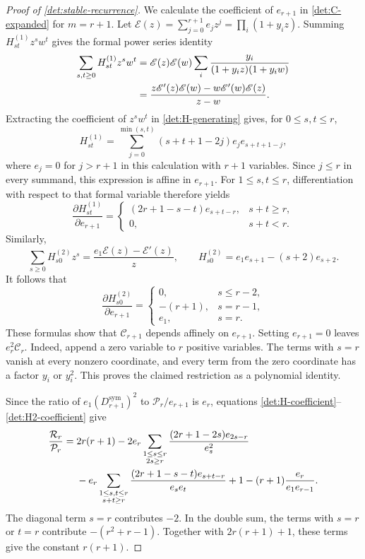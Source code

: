 \begin{proof}[Proof of \cref{det:stable-recurrence}]
We calculate the coefficient of $e_{r+1}$ in
\eqref{det:C-expanded} for $m=r+1$.  Let
$\mathscr E(z)=\sum_{j=0}^{r+1}e_jz^j=\prod_i(1+y_i z)$.
Summing \(H_{st}^{(1)}z^sw^t\) gives the formal power series identity
\begin{align}
 \sum_{s,t\geq0}H_{st}^{(1)}z^sw^t
 &=\mathscr E(z)\mathscr E(w)
       \sum_i\frac{y_i}{(1+y_i z)(1+y_i w)}\notag\\
 &=\frac{z\mathscr E'(z)\mathscr E(w)
          -w\mathscr E'(w)\mathscr E(z)}{z-w}.
 \label{det:H-generating}
\end{align}
Extracting the coefficient of $z^sw^t$ in
\eqref{det:H-generating} gives, for $0\leq s,t\leq r$,
\[
 H_{st}^{(1)}=\sum_{j=0}^{\min(s,t)}
       (s+t+1-2j)e_j e_{s+t+1-j},
\]
where $e_j=0$ for $j>r+1$ in this calculation with $r+1$ variables.
Since $j\leq r$ in every summand, this expression is affine in
$e_{r+1}$. For $1\leq s,t\leq r$, differentiation with respect to
that formal variable therefore yields
\begin{equation}\label{det:H-coefficient}
 \frac{\partial H_{st}^{(1)}}{\partial e_{r+1}}
 =\begin{cases}
   (2r+1-s-t)e_{s+t-r},&s+t\geq r,\\
   0,&s+t<r.
  \end{cases}
\end{equation}
Similarly,
\[
 \sum_{s\geq0}H_{s0}^{(2)}z^s
 =\frac{e_1\mathscr E(z)-\mathscr E'(z)}z,
 \qquad
 H_{s0}^{(2)}=e_1e_{s+1}-(s+2)e_{s+2}.
\]
It follows that
\begin{equation}\label{det:H2-coefficient}
 \frac{\partial H_{s0}^{(2)}}{\partial e_{r+1}}
 =\begin{cases}
   0,&s\leq r-2,\\
   -(r+1),&s=r-1,\\
   e_1,&s=r.
  \end{cases}
\end{equation}
These formulas show that $\mathcal C_{r+1}$ depends affinely on
$e_{r+1}$.  Setting $e_{r+1}=0$ leaves $e_r^2\mathcal C_r$.
Indeed, append a zero variable to $r$ positive variables.  The terms
with $s=r$ vanish at every nonzero coordinate, and every term from the
zero coordinate has a factor $y_i$ or $y_i^2$.  This proves the claimed
restriction as a polynomial identity.

Since the ratio of $e_1(D_{r+1}^{\mathrm{sym}})^2$ to
$\mathcal P_r/e_{r+1}$ is $e_r$, equations
\eqref{det:H-coefficient}--\eqref{det:H2-coefficient} give
\begin{align}
 \frac{\mathcal R_r}{\mathcal P_r}
 ={}&2r(r+1)
 -2e_r\sum_{\substack{1\leq s\leq r\\2s\geq r}}
       \frac{(2r+1-2s)e_{2s-r}}{e_s^2}\notag\\
 &-e_r\sum_{\substack{1\leq s,t\leq r\\s+t\geq r}}
       \frac{(2r+1-s-t)e_{s+t-r}}{e_se_t}
 +1-(r+1)\frac{e_r}{e_1e_{r-1}}.
 \label{det:R-before-grouping}
\end{align}
The diagonal term $s=r$ contributes $-2$.  In the double sum, the
terms with $s=r$ or $t=r$ contribute $-(r^2+r-1)$.  Together with
$2r(r+1)+1$, these terms give the constant $r(r+1)$.


\end{proof}
